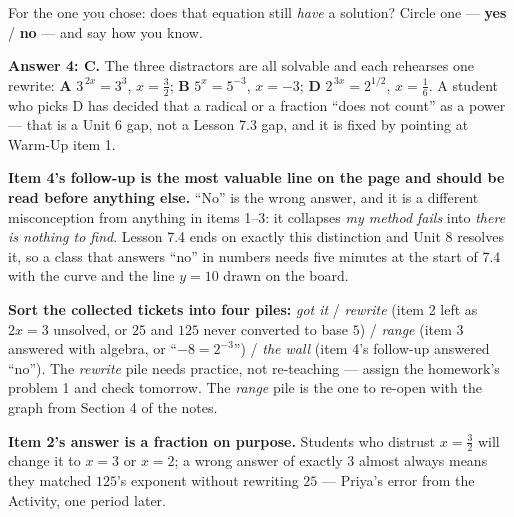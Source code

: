 \documentclass[10pt]{article}
\begin{document}
\begin{enumerate}[leftmargin=1.8em, itemsep=12pt]
        \vspace{4pt}
        For the one you chose: does that equation still \emph{have} a solution? Circle one ---
        \textcolor{keyred}{\textbf{yes}} \; / \; \textbf{no} --- and say how you know.

        \vspace{2pt}
\end{enumerate}

\begin{teachernote}
\textbf{Answer 4: C.} The three distractors are all solvable and each rehearses one rewrite:
\textbf{A} $3^{\,2x}=3^{3}$, $x=\frac32$; \textbf{B} $5^{x}=5^{-3}$, $x=-3$; \textbf{D}
$2^{\,3x}=2^{1/2}$, $x=\frac16$. A student who picks D has decided that a radical or a fraction ``does
not count'' as a power --- that is a Unit 6 gap, not a Lesson 7.3 gap, and it is fixed by pointing at
Warm-Up item 1.

\textbf{Item 4's follow-up is the most valuable line on the page and should be read before anything
else.} ``No'' is the wrong answer, and it is a different misconception from anything in items 1--3:
it collapses \emph{my method fails} into \emph{there is nothing to find}. Lesson 7.4 ends on exactly
this distinction and Unit 8 resolves it, so a class that answers ``no'' in numbers needs five minutes
at the start of 7.4 with the curve and the line $y=10$ drawn on the board.

\textbf{Sort the collected tickets into four piles:} \emph{got it} / \emph{rewrite} (item 2 left as
$2x=3$ unsolved, or $25$ and $125$ never converted to base $5$) / \emph{range} (item 3 answered with
algebra, or ``$-8=2^{-3}$'') / \emph{the wall} (item 4's follow-up answered ``no''). The
\emph{rewrite} pile needs practice, not re-teaching --- assign the homework's problem 1 and check
tomorrow. The \emph{range} pile is the one to re-open with the graph from Section 4 of the notes.

\textbf{Item 2's answer is a fraction on purpose.} Students who distrust $x=\frac32$ will change it to
$x=3$ or $x=2$; a wrong answer of exactly $3$ almost always means they matched $125$'s exponent
without rewriting $25$ --- Priya's error from the Activity, one period later.
\end{teachernote}
\end{document}
